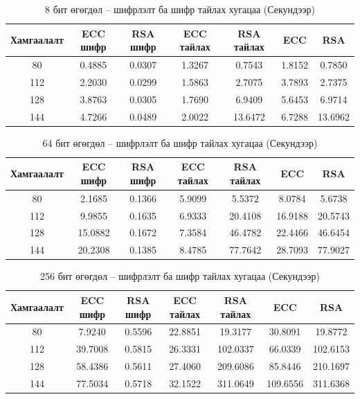 	\begin{table}
		\centering
		\caption{8 бит өгөгдөл – шифрлэлт ба шифр тайлах хугацаа (Секундээр) \cite{RSAvsECC}}
		\begin{tabular}{|c|c|c|c|c|c|c|}
		\hline
		Хамгаалалт & ECC шифр & RSA шифр & ECC тайлах & RSA тайлах & ECC & RSA \\
		\hline
		80 & 0.4885 & 0.0307 & 1.3267 & 0.7543 & 1.8152 & 0.7850 \\
		112 & 2.2030 & 0.0299 & 1.5863 & 2.7075 & 3.7893 & 2.7375 \\
		128 & 3.8763 & 0.0305 & 1.7690 & 6.9409 & 5.6453 & 6.9714 \\
		144 & 4.7266 & 0.0489 & 2.0022 & 13.6472 & 6.7288 & 13.6962 \\
		\hline
		\end{tabular}
		\end{table}
		
		\begin{table}
		\centering
		\caption{64 бит өгөгдөл – шифрлэлт ба шифр тайлах хугацаа (Секундээр) \cite{RSAvsECC}}
		\begin{tabular}{|c|c|c|c|c|c|c|}
		\hline
		Хамгаалалт & ECC шифр & RSA шифр & ECC тайлах & RSA тайлах & ECC  & RSA  \\
		\hline
		80 & 2.1685 & 0.1366 & 5.9099 & 5.5372 & 8.0784 & 5.6738 \\
		112 & 9.9855 & 0.1635 & 6.9333 & 20.4108 & 16.9188 & 20.5743 \\
		128 & 15.0882 & 0.1672 & 7.3584 & 46.4782 & 22.4466 & 46.6454 \\
		144 & 20.2308 & 0.1385 & 8.4785 & 77.7642 & 28.7093 & 77.9027 \\
		\hline
		\end{tabular}
		\end{table}
		
		\begin{table}
		\centering
		\caption{256 бит өгөгдөл – шифрлэлт ба шифр тайлах хугацаа (Секундээр) \cite{RSAvsECC}}
		\begin{tabular}{|c|c|c|c|c|c|c|}
		\hline
		Хамгаалалт & ECC шифр & RSA шифр & ECC тайлах & RSA тайлах & ECC  & RSA  \\
		\hline
		80 & 7.9240 & 0.5596 & 22.8851 & 19.3177 & 30.8091 & 19.8772 \\
		112 & 39.7008 & 0.5815 & 26.3331 & 102.0337 & 66.0339 & 102.6153 \\
		128 & 58.4386 & 0.5611 & 27.4060 & 209.6086 & 85.8446 & 210.1697 \\
		144 & 77.5034 & 0.5718 & 32.1522 & 311.0649 & 109.6556 & 311.6368 \\
		\hline
		\end{tabular}
		\end{table}


